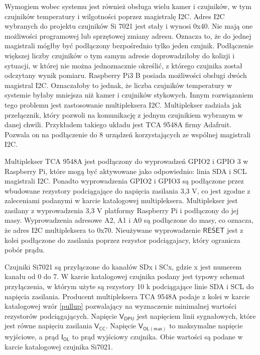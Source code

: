 \documentclass[a4paper,11pt,twoside]{article}
\begin{document}
Wymogiem wobec systemu jest również obsługa wielu kamer i czujników, w tym czujników temperatury i wilgotności poprzez magistralę I2C. Adres I2C wybranych do projektu czujników Si 7021 jest stały i wynosi 0x40. Nie mają one możliwości programowej lub sprzętowej zmiany adresu. Oznacza to, że do jednej magistrali mógłby być podłączony bezpośrednio tylko jeden czujnik. Podłączenie większej liczby czujników o tym samym adresie doprowadziłoby do kolizji i sytuacji, w której nie można jednoznacznie określić, z którego czujnika został odczytany wynik pomiaru. Raspberry Pi3 B posiada możliwości obsługi dwóch magistral I2C. Oznaczałoby to jednak, że liczba czujników temperatury w systemie byłaby mniejsza niż kamer i czujników stykowych. Innym rozwiązaniem tego problemu jest zastosowanie multipleksera I2C. Multiplekser zadziała jak przełącznik, który pozwoli na komunikację z jednym czujnikiem wybranym w danej chwili. Przykładem takiego układu jest TCA 9548A firmy Adafruit. Pozwala on na podłączenie do 8 urządzeń korzystających ze wspólnej magistrali I2C.

Multiplekser TCA 9548A jest podłączony do wyprowadzeń GPIO2 i GPIO 3 w Raspberry Pi, które mogą być aktywowane jako odpowiednio: linia SDA i SCL magistrali I2C. Ponadto wyprowadzenia GPIO2 i GPIO3 są podłączone przez wbudowane rezystory podciągające do napięcia zasilania 3,3 V\cite{rpi_schematic}, co jest zgodne z zaleceniami podanymi w karcie katalogowej multipleksera.\cite{multiplekser} Multiplekser jest zasilany z wyprowadzenia 3,3 V platformy Raspberry Pi i podłączony do jej masy. Wyprowadzenia adresowe A2, A1 i A0 są podłączone do masy, co oznacza, że adres I2C multipleksera to 0x70. Nieużywane wyprowadzenie $\overline{\mathsf{RESET}}$ jest z kolei podłączone do zasilania poprzez rezystor podciągajacy, który ogranicza pobór prądu.

Czujniki Si7021 są przyłączone do kanałów SDx i SCx, gdzie x jest numerem kanału od 0 do 7. W karcie katalogowej czujnika podany jest typowy schemat przyłączenia, w którym użyte są rezystory 10 k\textOmega\hspace{0.2em} podciągające  linie SDA i SCL do napięcia zasilania. Producent multipleksera TCA 9548A podaje z kolei w karcie katalogowej wzór \ref{pullup} pozwalający na wyznaczenie minimalnej wartości rezystorów podciągających.\cite{multiplekser} Napięcie $\mathsf{V_{DPU}}$ jest napięciem linii sygnałowych, które jest równe napięciu zasilania $\mathsf{V_{CC}}$. Napięcie $\mathsf{V_{OL(max)}}$ to maksymalne napięcie wyjściowe, a prąd $\mathsf{I_{OL}}$ to prąd wyjściowy czujnika. Obie wartości są podane w karcie katalogowej czujnika Si7021.\cite{czujnik_temp}
\end{document}
